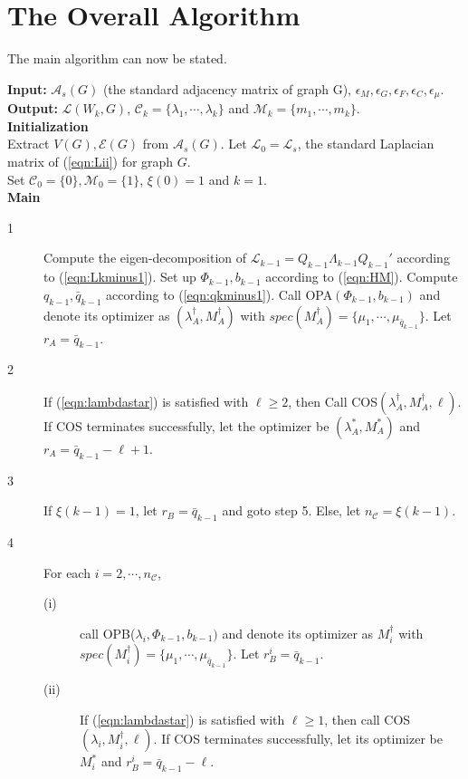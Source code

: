 \documentclass[onecolumn,reviewcopy]{autart}
\def \L{\mathcal{L}}
\def \E{\mathcal{E}}
\def \A{\mathcal{A}}
\def \C{\mathcal{C}}
\def \M{\mathcal{M}}
\begin{document}
\section{The Overall Algorithm} \label{sec:algo}
The main algorithm can now be stated.

\begin{algorithm}[H]
\caption{The Minimal Polynomial Algorithm}
\textbf{Input:} $\A_s(G)$ (the standard adjacency matrix of graph G), $\epsilon_M, \epsilon_G, \epsilon_F, \epsilon_C, \epsilon_\mu.$\\
\textbf{Output:} $\L(W_k,G)$, $\C_k=\{\lambda_1,\cdots,\lambda_k\}$ and $\M_k=\{m_1, \cdots, m_k\}$. \\
\textbf{Initialization} \\
Extract $V(G), \E(G)$ from $\A_s(G)$.
Let $\L_0=\L_s$, the standard Laplacian matrix of (\ref{eqn:Lii}) for graph $G$.\\
Set $\C_0=\{0\}, \M_0=\{1\}$, $\xi(0)=1$ and $k=1$. \\
\textbf{Main}
\begin{description}
  \item[1] Compute the eigen-decomposition of $\L_{k-1}=Q_{k-1} \Lambda_{k-1} Q_{k-1}'$ according to (\ref{eqn:Lkminus1}). Set up $\Phi_{k-1}, b_{k-1}$ according to (\ref{eqn:HM}). Compute $q_{k-1}, \bar{q}_{k-1}$ according to (\ref{eqn:qkminus1}). Call OPA$(\Phi_{k-1}, b_{k-1})$ and denote its optimizer as $(\lambda_A^\dag,M_A^\dag)$ with $spec(M_A^\dag)=\{\mu_1,\cdots, \mu_{\bar{q}_{k-1}}\}$. Let $r_A=\bar{q}_{k-1}$.
  \item[2] If (\ref{eqn:lambdastar}) is satisfied with $\ell \ge 2$, then Call COS$(\lambda_A^\dag,M_A^\dag, \ell)$. If COS terminates successfully, let the optimizer be $(\lambda_A^*,M_A^*)$ and $r_A = \bar{q}_{k-1}-\ell+1$.
  \item[3] If $\xi(k-1)=1$, let $r_B=\bar{q}_{k-1}$ and goto step 5. Else, let $n_\C = \xi(k-1)$.
  \item[4] For each $i=2, \cdots, n_\C$,
\begin{description}
  \item[(i)] call OPB($\lambda_i,\Phi_{k-1}, b_{k-1})$ and denote its optimizer as $M_i^\dag$ with $spec(M_i^\dag)=\{\mu_1,\cdots, \mu_{\bar{q}_{k-1}}\}$. Let $r^i_B = \bar{q}_{k-1}$.
  \item[(ii)] If (\ref{eqn:lambdastar}) is satisfied with $\ell \ge 1$, then call COS$(\lambda_i, M_i^\dag, \ell)$. If COS terminates successfully, let its optimizer be $M_i^*$ and $r^i_B = \bar{q}_{k-1}-\ell$.

\end{description}
\end{description}
\end{algorithm}
\end{document}
